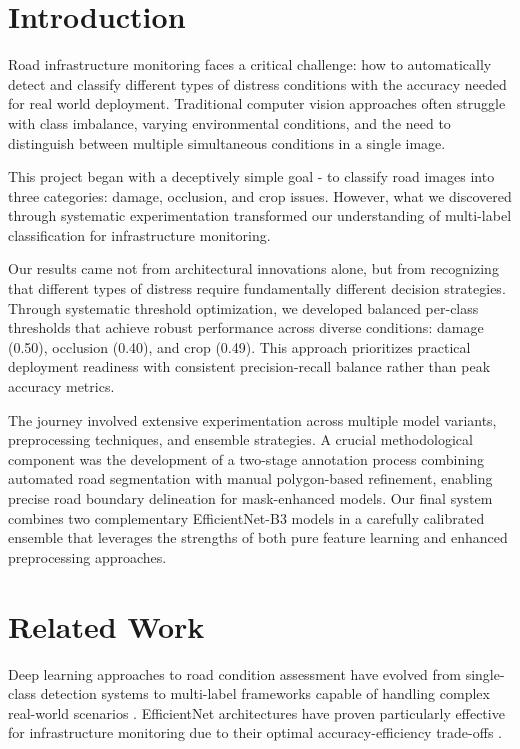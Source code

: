 \documentclass[12pt]{article}
\begin{document}
\section{Introduction}

Road infrastructure monitoring faces a critical challenge: how to automatically detect and classify different types of distress conditions with the accuracy needed for real world deployment. Traditional computer vision approaches often struggle with class imbalance, varying environmental conditions, and the need to distinguish between multiple simultaneous conditions in a single image.

This project began with a deceptively simple goal - to classify road images into three categories: damage, occlusion, and crop issues. However, what we discovered through systematic experimentation transformed our understanding of multi-label classification for infrastructure monitoring.

Our results came not from architectural innovations alone, but from recognizing that different types of distress require fundamentally different decision strategies. Through systematic threshold optimization, we developed balanced per-class thresholds that achieve robust performance across diverse conditions: damage (0.50), occlusion (0.40), and crop (0.49). This approach prioritizes practical deployment readiness with consistent precision-recall balance rather than peak accuracy metrics.

The journey involved extensive experimentation across multiple model variants, preprocessing techniques, and ensemble strategies. A crucial methodological component was the development of a two-stage annotation process combining automated road segmentation with manual polygon-based refinement, enabling precise road boundary delineation for mask-enhanced models. Our final system combines two complementary EfficientNet-B3 models in a carefully calibrated ensemble that leverages the strengths of both pure feature learning and enhanced preprocessing approaches.

\section{Related Work}

Deep learning approaches to road condition assessment have evolved from single-class detection systems to multi-label frameworks capable of handling complex real-world scenarios \citet{he2016deep}. EfficientNet architectures have proven particularly effective for infrastructure monitoring due to their optimal accuracy-efficiency trade-offs \citet{krizhevsky2012imagenet}.
\end{document}
